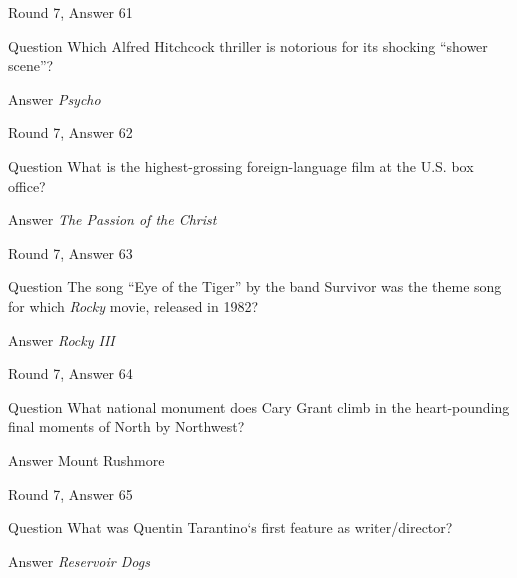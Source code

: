 \documentclass[11pt]{beamer}
\begin{document}
\begin{frame}[t]{Round 7, Answer 61}
\vspace{2em}
\begin{block}{Question}
Which Alfred Hitchcock thriller is notorious for its shocking ``shower scene''?
\end{block}
\pause{}
\begin{block}{Answer}
\emph{Psycho}
\end{block}
\end{frame}
    

\begin{frame}[t]{Round 7, Answer 62}
\vspace{2em}
\begin{block}{Question}
What is the highest-grossing foreign-language film at the U.S. box office?
\end{block}
\pause{}
\begin{block}{Answer}
\emph{The Passion of the Christ}
\end{block}
\end{frame}
    

\begin{frame}[t]{Round 7, Answer 63}
\vspace{2em}
\begin{block}{Question}
The song ``Eye of the Tiger'' by the band Survivor was the theme song for which \emph{Rocky} movie, released in 1982?
\end{block}
\pause{}
\begin{block}{Answer}
\emph{Rocky III}
\end{block}
\end{frame}
    

\begin{frame}[t]{Round 7, Answer 64}
\vspace{2em}
\begin{block}{Question}
What national monument does Cary Grant climb in the heart-pounding final moments of North by Northwest?
\end{block}
\pause{}
\begin{block}{Answer}
Mount Rushmore
\end{block}
\end{frame}
    

\begin{frame}[t]{Round 7, Answer 65}
\vspace{2em}
\begin{block}{Question}
What was Quentin Tarantino`s first feature as writer/director?
\end{block}
\pause{}
\begin{block}{Answer}
\emph{Reservoir Dogs}
\end{block}
\end{frame}
    
\end{document}
